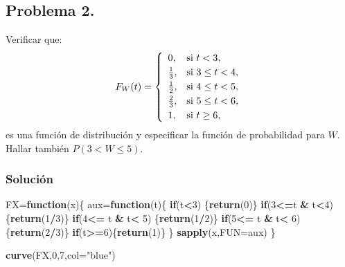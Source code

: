 \documentclass[
]{article}
\newenvironment{Shaded}{\begin{snugshade}}{\end{snugshade}}
\newcommand{\AttributeTok}[1]{\textcolor[rgb]{0.13,0.29,0.53}{#1}}
\newcommand{\ControlFlowTok}[1]{\textcolor[rgb]{0.13,0.29,0.53}{\textbf{#1}}}
\newcommand{\DecValTok}[1]{\textcolor[rgb]{0.00,0.00,0.81}{#1}}
\newcommand{\FunctionTok}[1]{\textcolor[rgb]{0.13,0.29,0.53}{\textbf{#1}}}
\newcommand{\NormalTok}[1]{#1}
\newcommand{\OtherTok}[1]{\textcolor[rgb]{0.56,0.35,0.01}{#1}}
\newcommand{\SpecialCharTok}[1]{\textcolor[rgb]{0.81,0.36,0.00}{\textbf{#1}}}
\newcommand{\StringTok}[1]{\textcolor[rgb]{0.31,0.60,0.02}{#1}}
\begin{document}
\hypertarget{problema-2.}{%
\subsection{Problema 2.}\label{problema-2.}}

Verificar que: \[F_W (t)=
\left\{\begin{array}{ll}
0, & \mbox{si $t<3$},
 \\[0.1cm]
{1\over 3}, & \mbox{si $3\leq t<4$},
 \\[0.1cm]
{1\over 2}, & \mbox{si $4\leq t<5$},
 \\[0.1cm] 
{2\over 3}, & \mbox{si $5\leq t<6$},
 \\[0.1cm] 
1, & \mbox{si $t\geq 6$},
\end{array}\right.
\] es una función de distribución y especificar la función de
probabilidad para \(W\). Hallar también \(P(3<W\leq 5)\).

\hypertarget{soluciuxf3n-1}{%
\subsubsection{Solución}\label{soluciuxf3n-1}}

\begin{Shaded}
\begin{Highlighting}[]
\NormalTok{FX}\OtherTok{=}\ControlFlowTok{function}\NormalTok{(x)\{}
\NormalTok{  aux}\OtherTok{=}\ControlFlowTok{function}\NormalTok{(t)\{}
    \ControlFlowTok{if}\NormalTok{(t}\SpecialCharTok{\textless{}}\DecValTok{3}\NormalTok{) \{}\FunctionTok{return}\NormalTok{(}\DecValTok{0}\NormalTok{)\}}
    \ControlFlowTok{if}\NormalTok{(}\DecValTok{3}\SpecialCharTok{\textless{}=}\NormalTok{t }\SpecialCharTok{\&}\NormalTok{ t}\SpecialCharTok{\textless{}}\DecValTok{4}\NormalTok{) \{}\FunctionTok{return}\NormalTok{(}\DecValTok{1}\SpecialCharTok{/}\DecValTok{3}\NormalTok{)\}}
    \ControlFlowTok{if}\NormalTok{(}\DecValTok{4}\SpecialCharTok{\textless{}=}\NormalTok{ t }\SpecialCharTok{\&}\NormalTok{ t}\SpecialCharTok{\textless{}} \DecValTok{5}\NormalTok{) \{}\FunctionTok{return}\NormalTok{(}\DecValTok{1}\SpecialCharTok{/}\DecValTok{2}\NormalTok{)\}}
    \ControlFlowTok{if}\NormalTok{(}\DecValTok{5}\SpecialCharTok{\textless{}=}\NormalTok{ t }\SpecialCharTok{\&}\NormalTok{ t}\SpecialCharTok{\textless{}} \DecValTok{6}\NormalTok{) \{}\FunctionTok{return}\NormalTok{(}\DecValTok{2}\SpecialCharTok{/}\DecValTok{3}\NormalTok{)\}}
    \ControlFlowTok{if}\NormalTok{(t}\SpecialCharTok{\textgreater{}=}\DecValTok{6}\NormalTok{)\{}\FunctionTok{return}\NormalTok{(}\DecValTok{1}\NormalTok{)\}}
\NormalTok{    \}}
  \FunctionTok{sapply}\NormalTok{(x,}\AttributeTok{FUN=}\NormalTok{aux)}
\NormalTok{\}}

\FunctionTok{curve}\NormalTok{(FX,}\DecValTok{0}\NormalTok{,}\DecValTok{7}\NormalTok{,}\AttributeTok{col=}\StringTok{"blue"}\NormalTok{)}
\end{Highlighting}
\end{Shaded}
\end{document}
